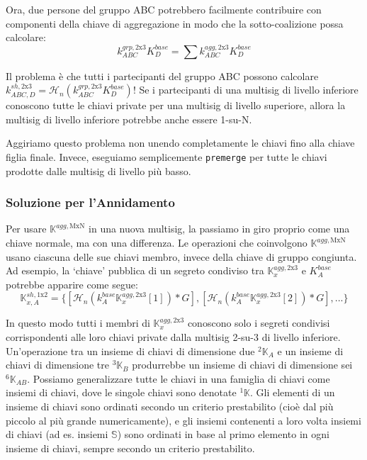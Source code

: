 Ora, due persone del gruppo ABC potrebbero facilmente contribuire con componenti della chiave di aggregazione in modo che la sotto-coalizione possa calcolare:\vspace{.175cm}
\[k^{grp,\textrm{2x3}}_{ABC} K^{base}_D = \sum k^{agg,\textrm{2x3}}_{ABC} K^{base}_D\]

Il problema è che tutti i partecipanti del gruppo ABC possono calcolare $k^{sh,\textrm{2x3}}_{ABC,D} = \mathcal{H}_n(k^{grp,\textrm{2x3}}_{ABC} K^{base}_D)$! Se i partecipanti di una multisig di livello inferiore conoscono tutte le chiavi private per una multisig di livello superiore, allora la multisig di livello inferiore potrebbe anche essere 1-su-N.

Aggiriamo questo problema non unendo completamente le chiavi fino alla chiave figlia finale. Invece, eseguiamo semplicemente {\tt premerge} per tutte le chiavi prodotte dalle multisig di livello più basso.

\subsubsection*{Soluzione per l'Annidamento}

Per usare $\mathbb{K}^{agg,\textrm{MxN}}$ in una nuova multisig, la passiamo in giro proprio come una chiave normale, ma con una differenza. Le operazioni che coinvolgono $\mathbb{K}^{agg,\textrm{MxN}}$ usano ciascuna delle sue chiavi membro, invece della chiave di gruppo congiunta. Ad esempio, la `chiave' pubblica di un segreto condiviso tra $\mathbb{K}^{agg,\textrm{2x3}}_x$ e $K^{base}_A$ potrebbe apparire come segue:\vspace{.175cm}
\[\mathbb{K}^{sh,\textrm{1x2}}_{x,A} = \{ [\mathcal{H}_n(k^{base}_A \mathbb{K}^{agg,\textrm{2x3}}_x[1])*G], [\mathcal{H}_n(k^{base}_A \mathbb{K}^{agg,\textrm{2x3}}_x[2])*G], ...\}\]

In questo modo tutti i membri di $\mathbb{K}^{agg,\textrm{2x3}}_x$ conoscono solo i segreti condivisi corrispondenti alle loro chiavi private dalla multisig 2-su-3 di livello inferiore. Un'operazione tra un insieme di chiavi di dimensione due ${}^{2}\mathbb{K}_A$ e un insieme di chiavi di dimensione tre ${}^{3}\mathbb{K}_B$ produrrebbe un insieme di chiavi di dimensione sei ${}^{6}\mathbb{K}_{AB}$. Possiamo generalizzare tutte le chiavi in una famiglia di chiavi come insiemi di chiavi, dove le singole chiavi sono denotate ${}^{1}\mathbb{K}$. Gli elementi di un insieme di chiavi sono ordinati secondo un criterio prestabilito (cioè dal più piccolo al più grande numericamente), e gli insiemi contenenti a loro volta insiemi di chiavi (ad es. insiemi $\mathbb{S}$) sono ordinati in base al primo elemento in ogni insieme di chiavi, sempre secondo un criterio prestabilito.\\

